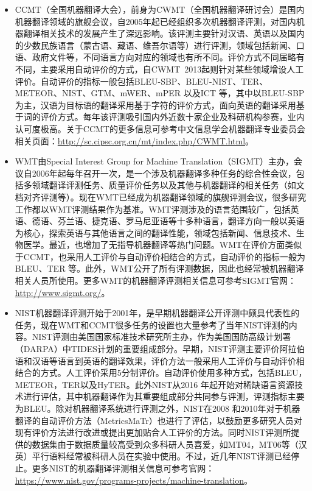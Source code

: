 \begin{itemize}
\vspace{0.5em}
\item CCMT（全国机器翻译大会），前身为CWMT（全国机器翻译研讨会）是国内机器翻译领域的旗舰会议，自2005年起已经组织多次机器翻译评测，对国内机器翻译相关技术的发展产生了深远影响。该评测主要针对汉语、英语以及国内的少数民族语言（蒙古语、藏语、维吾尔语等）进行评测，领域包括新闻、口语、政府文件等，不同语言方向对应的领域也有所不同。评价方式不同届略有不同，主要采用自动评价的方式，自CWMT\ 2013起则针对某些领域增设人工评价。自动评价的指标一般包括BLEU-SBP、BLEU-NIST、TER、METEOR、NIST、GTM、mWER、mPER 以及ICT 等，其中以BLEU-SBP 为主，汉语为目标语的翻译采用基于字符的评价方式，面向英语的翻译采用基于词的评价方式。每年该评测吸引国内外近数十家企业及科研机构参赛，业内认可度极高。关于CCMT的更多信息可参考中文信息学会机器翻译专业委员会相关页面：\url{http://sc.cipsc.org.cn/mt/index.php/CWMT.html}。
\vspace{0.5em}
\item WMT由Special Interest Group for Machine Translation（SIGMT）主办，会议自2006年起每年召开一次，是一个涉及机器翻译多种任务的综合性会议，包括多领域翻译评测任务、质量评价任务以及其他与机器翻译的相关任务（如文档对齐评测等）。现在WMT已经成为机器翻译领域的旗舰评测会议，很多研究工作都以WMT评测结果作为基准。WMT评测涉及的语言范围较广，包括英语、德语、芬兰语、捷克语、罗马尼亚语等十多种语言，翻译方向一般以英语为核心，探索英语与其他语言之间的翻译性能，领域包括新闻、信息技术、生物医学。最近，也增加了无指导机器翻译等热门问题。WMT在评价方面类似于CCMT，也采用人工评价与自动评价相结合的方式，自动评价的指标一般为BLEU、TER 等。此外，WMT公开了所有评测数据，因此也经常被机器翻译相关人员所使用。更多WMT的机器翻译评测相关信息可参考SIGMT官网：\url{http://www.sigmt.org/}。
\vspace{0.5em}
\item NIST机器翻译评测开始于2001年，是早期机器翻译公开评测中颇具代表性的任务，现在WMT和CCMT很多任务的设置也大量参考了当年NIST评测的内容。NIST评测由美国国家标准技术研究所主办，作为美国国防高级计划署（DARPA）中TIDES计划的重要组成部分。早期，NIST评测主要评价阿拉伯语和汉语等语言到英语的翻译效果，评价方法一般采用人工评价与自动评价相结合的方式。人工评价采用5分制评价。自动评价使用多种方式，包括BLEU，METEOR，TER以及HyTER。此外NIST从2016 年起开始对稀缺语言资源技术进行评估，其中机器翻译作为其重要组成部分共同参与评测，评测指标主要为BLEU。除对机器翻译系统进行评测之外，NIST在2008 和2010年对于机器翻译的自动评价方法（MetricsMaTr）也进行了评估，以鼓励更多研究人员对现有评价方法进行改进或提出更加贴合人工评价的方法。同时NIST评测所提供的数据集由于数据质量较高受到众多科研人员喜爱，如MT04，MT06等（汉英）平行语料经常被科研人员在实验中使用。不过，近几年NIST评测已经停止。更多NIST的机器翻译评测相关信息可参考官网：\url{https://www.nist.gov/programs-projects/machine-translation}。

\end{itemize}

